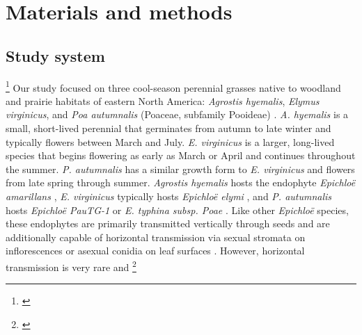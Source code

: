 \documentclass[12pt]{article}\usepackage[]{graphicx}\usepackage[dvipsnames]{xcolor}
\newcommand{\tom}[2]{{\color{red}{#1}}\footnote{\textit{\color{red}{#2}}}}
\begin{document}
\section*{Materials and methods}
\subsection*{Study system}
\tom{}{I think this section should also say something about the herbivores in this system.}
Our study focused on three cool-season perennial grasses native to woodland and prairie habitats of eastern North America: \emph{Agrostis hyemalis}, \emph{Elymus virginicus}, and \emph{Poa autumnalis} (Poaceae, subfamily Pooideae) \citep{shaw2011guide}.
\emph{A. hyemalis} is a small, short-lived perennial that germinates from autumn to late winter and typically flowers between March and July. \emph{E. virginicus} is a larger, long-lived species that begins flowering as early as March or April and continues throughout the summer. \emph{P. autumnalis} has a similar growth form to \emph{E. virginicus} and flowers from late spring through summer. 
\emph{Agrostis hyemalis} hosts the endophyte \emph{Epichloë amarillans} \citep{white1994endophyte}, \emph{E. virginicus} typically hosts \emph{Epichloë elymi} \citep{liu2023fungi}, and \emph{P. autumnalis} hosts \emph{Epichloë PauTG-1} or \emph{E. typhina subsp. Poae} \citep{gundel2020simulated}.
Like other \emph{Epichloë} species, these endophytes are primarily transmitted vertically through seeds and are additionally capable of horizontal transmission via sexual stromata on inflorescences or asexual conidia on leaf surfaces \citep{clay2002evolutionary, gundel2020simulated,leuchtmann2014nomenclatural}. 
However, horizontal transmission is very rare and \tom{was not observed in our study system.}{This is not true. There were a good number of stroma observations on AGHY, and it would be possible to include those data here if you want.}
\end{document}
